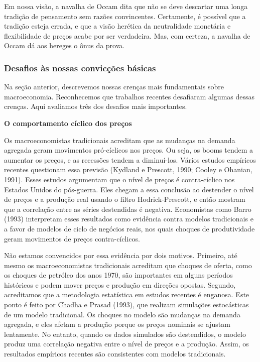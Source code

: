 \documentclass[a4paper,12pt]{article}[abntex2]
\begin{document}
Em nossa visão, a navalha de Occam dita que não se deve descartar uma longa tradição de pensamento sem razões convincentes. Certamente, é possível que a tradição esteja errada, e que a visão herética da neutralidade monetária e flexibilidade de preços acabe por ser verdadeira. Mas, com certeza, a navalha de Occam dá aos hereges o ônus da prova.

\subsubsection{\textbf{Desafios às nossas convicções básicas}}

Na seção anterior, descrevemos nossas crenças mais fundamentais sobre macroeconomia. Reconhecemos que trabalhos recentes desafiaram algumas dessas crenças. Aqui avaliamos três dos desafios mais importantes.

\textbf{O comportamento cíclico dos preços}

Os macroeconomistas tradicionais acreditam que as mudanças na demanda agregada geram movimentos pró-cíclicos nos preços. Ou seja, os booms tendem a aumentar os preços, e as recessões tendem a diminuí-los. Vários estudos empíricos recentes questionam essa previsão (Kydland e Prescott, 1990; Cooley e Ohanian, 1991). Esses estudos argumentam que o nível de preços é contra-cíclico nos Estados Unidos do pós-guerra. Eles chegam a essa conclusão ao destender o nível de preços e a produção real usando o filtro Hodrick-Prescott, e então mostram que a correlação entre as séries destendidas é negativa. Economistas como Barro (1993) interpretam esses resultados como evidência contra modelos tradicionais e a favor de modelos de ciclo de negócios reais, nos quais choques de produtividade geram movimentos de preços contra-cíclicos.

Não estamos convencidos por essa evidência por dois motivos. Primeiro, até mesmo os macroeconomistas tradicionais acreditam que choques de oferta, como os choques de petróleo dos anos 1970, são importantes em alguns períodos históricos e podem mover preços e produção em direções opostas. Segundo, acreditamos que a metodologia estatística em estudos recentes é enganosa. Este ponto é feito por Chadha e Prasad (1993), que realizam simulações estocásticas de um modelo tradicional. Os choques no modelo são mudanças na demanda agregada, e eles afetam a produção porque os preços nominais se ajustam lentamente. No entanto, quando os dados simulados são destendidos, o modelo produz uma correlação negativa entre o nível de preços e a produção. Assim, os resultados empíricos recentes são consistentes com modelos tradicionais.
\end{document}
